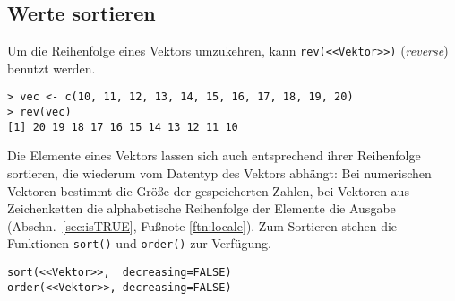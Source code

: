 \subsection{Werte sortieren}
\label{sec:revSortOrder}

Um die Reihenfolge eines Vektors umzukehren, kann \lstinline!rev(<<Vektor>>)! (\emph{reverse}) benutzt werden.
\begin{lstlisting}
> vec <- c(10, 11, 12, 13, 14, 15, 16, 17, 18, 19, 20)
> rev(vec)
[1] 20 19 18 17 16 15 14 13 12 11 10
\end{lstlisting}

Die Elemente eines Vektors lassen sich auch entsprechend ihrer Reihenfolge sortieren, die wiederum vom Datentyp des Vektors abhängt: Bei numerischen Vektoren bestimmt die Größe der gespeicherten Zahlen, bei Vektoren aus Zeichenketten die alphabetische Reihenfolge der Elemente die Ausgabe (Abschn.\ \ref{sec:isTRUE}, Fußnote \ref{ftn:locale}). Zum Sortieren stehen die Funktionen \lstinline!sort()! und \lstinline!order()! zur Verfügung.
\begin{lstlisting}
sort(<<Vektor>>,  decreasing=FALSE)
order(<<Vektor>>, decreasing=FALSE)
\end{lstlisting}

